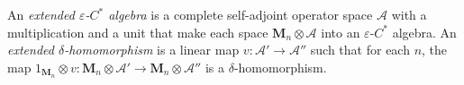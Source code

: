 \hypertarget{def:extended-epsilon-cstar-algebra}{}%
\begin{definition}\label{def:extended-epsilon-cstar-algebra}
An \emph{extended $\varepsilon$-$C^*$ algebra} is a complete self-adjoint operator space $\mathcal{A}$ with a multiplication and a unit that make each space $\mathbf{M}_{n}\otimes\mathcal{A}$ into an $\varepsilon$-$C^*$ algebra. An \emph{extended $\delta$-homomorphism} is a linear map $v\colon\mathcal{A}'\to\mathcal{A}''$ such that for each $n$, the map $1_{\mathbf{M}_{n}}\otimes v\colon \mathbf{M}_{n}\otimes\mathcal{A}'\to\mathbf{M}_{n}\otimes\mathcal{A}''$ is a $\delta$-homomorphism.
\end{definition}
